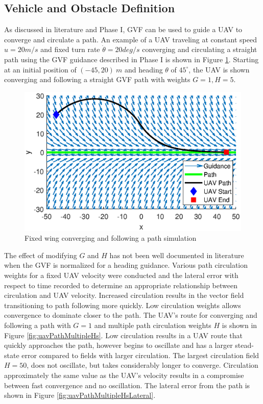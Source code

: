 \documentclass[numbered,pdftex]{ohio-etd}
\begin{document}
\subsection{Vehicle and Obstacle Definition}

As discussed in literature and Phase I, GVF can be used to guide a UAV to converge and circulate a path. An example of a UAV traveling at constant speed $u=20m/s$ and fixed turn rate $\dot{\theta}=20deg/s$ converging and circulating a straight path using the GVF guidance described in Phase I is shown in Figure \ref{fig:uavPathFollowDemo}. Starting at an initial position of $(-45,20) \ m$ and heading $\theta$ of $45^\circ$, the UAV is shown converging and following a straight GVF path with weights $G=1,H=5$.


\begin{figure}[H]
	\centering
	\includegraphics[trim=0 25 0 45,clip,width=14cm]{PaperFigures/Methods/uavPathFollowDemo}
	\caption{Fixed wing converging and following a path simulation}
	\label{fig:uavPathFollowDemo}
\end{figure}

The effect of modifying $G$ and $H$ has not been well documented in literature when the GVF is normalized for a heading guidance. Various path circulation weights for a fixed UAV velocity were conducted and the lateral error with respect to time recorded to determine an appropriate relationship between circulation and UAV velocity. Increased circulation results in the vector field transitioning to path following more quickly. Low circulation weights allows convergence to dominate closer to the path. The UAV's route for converging and following a path with $G=1$ and multiple path circulation weights $H$ is shown in Figure \ref{fig:uavPathMultipleHs}. Low circulation results in a UAV route that quickly approaches the path, however begins to oscillate and has a larger stead-state error compared to fields with larger circulation. The largest circulation field $H=50$, does not oscillate, but takes considerably longer to converge. Circulation approximately the same value as the UAV's velocity results in a compromise between fast convergence and no oscillation. The lateral error from the path is shown in Figure \ref{fig:uavPathMultipleHsLateral}. 
\end{document}
